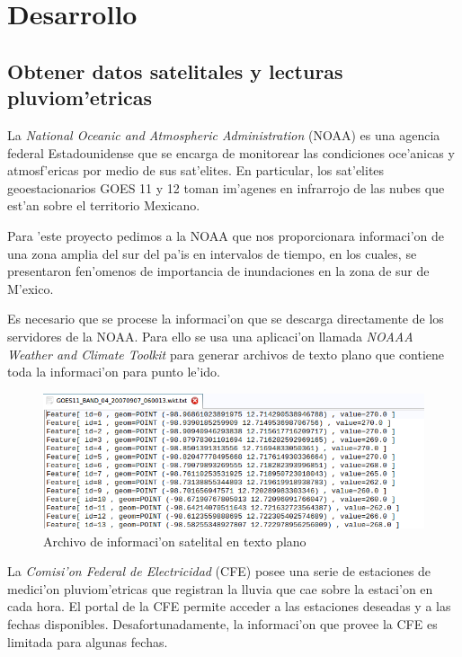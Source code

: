\chapter{Desarrollo}

\section{Obtener datos satelitales y lecturas \\ pluviom'etricas}

  La  \textit{National Oceanic and Atmospheric Administration} (NOAA) es una agencia federal Estadounidense que se encarga de 
  monitorear las condiciones oce'anicas y atmosf'ericas por medio de sus sat'elites.
  En particular, los sat'elites geoestacionarios GOES 11 y 12 toman im'agenes en infrarrojo de las nubes que est'an sobre
  el territorio Mexicano.

  Para 'este proyecto pedimos a la NOAA que nos proporcionara informaci'on de una zona amplia del sur del pa'is en 
  intervalos de tiempo, en los cuales, se presentaron fen'omenos de
  importancia de inundaciones en la zona de sur de M'exico.

  Es necesario que se procese la informaci'on que se descarga directamente de los servidores de la NOAA. Para ello se usa
  una aplicaci'on llamada \textit{NOAAA Weather and Climate Toolkit} para generar archivos de texto plano que contiene
  toda la informaci'on para punto le'ido.

  \begin{figure}[h!]
  \centering
  \includegraphics[width=150mm]{./imagenes/archivoTxt.png}
  \caption{Archivo de informaci'on satelital en texto plano}
  \end{figure}


  La \textit{Comisi'on Federal de Electricidad} (CFE) posee una serie de estaciones de medici'on pluviom'etricas que registran 
  la lluvia que cae sobre la estaci'on en cada hora. El portal de la CFE permite acceder a las estaciones deseadas 
  y a las fechas disponibles. Desafortunadamente, la informaci'on que provee la CFE es limitada para algunas fechas.




